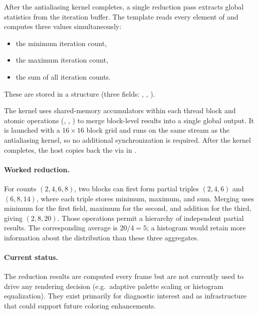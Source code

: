 After the antialiasing kernel completes, a single reduction pass
extracts global statistics from the iteration buffer.  The
 template reads every element of
 and computes three values simultaneously:
\begin{itemize}
  \item the minimum iteration count,
  \item the maximum iteration count,
  \item the sum of all iteration counts.
\end{itemize}
These are stored in a  structure
(three  fields: , , ).

The kernel uses shared-memory accumulators within each thread block
and atomic operations (, ,
) to merge block-level results into a single global
output.  It is launched with a $16\times16$ block grid and runs on
the same stream as the antialiasing kernel, so no additional
synchronization is required.  After the kernel completes, the host
copies back the  via  in
.

\paragraph{Worked reduction.}
For counts $(2,4,6,8)$, two blocks can first form partial triples $(2,4,6)$ and
$(6,8,14)$, where each triple stores minimum, maximum, and sum. Merging uses
minimum for the first field, maximum for the second, and addition for the third,
giving $(2,8,20)$. Those operations permit a hierarchy of independent partial
results. The corresponding average is $20/4=5$; a histogram would retain more
information about the distribution than these three aggregates.

\paragraph{Current status.}
The reduction results are computed every frame but are not currently
used to drive any rendering decision (e.g.\ adaptive palette scaling
or histogram equalization).  They exist primarily for diagnostic
interest and as infrastructure that could support future coloring
enhancements.


